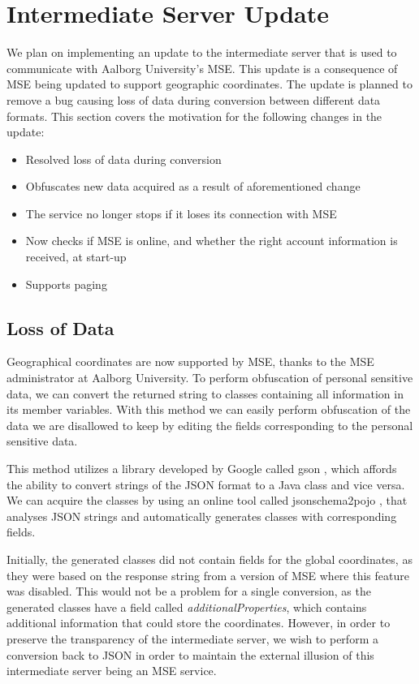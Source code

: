 \section{Intermediate Server Update}\label{sec:proxy_update1}
We plan on implementing an update to the intermediate server that is used to communicate with Aalborg University's MSE. This update is a consequence of MSE being updated to support geographic coordinates. The update is planned to remove a bug causing loss of data during conversion between different data formats. This section covers the motivation for the following changes in the update:

\begin{itemize}
\item Resolved loss of data during conversion
\item Obfuscates new data acquired as a result of aforementioned change
\item The service no longer stops if it loses its connection with MSE
\item Now checks if MSE is online, and whether the right account information is received, at start-up
\item Supports paging
\end{itemize}

\subsection{Loss of Data}
Geographical coordinates are now supported by MSE, thanks to the MSE administrator at Aalborg University. To perform obfuscation of personal sensitive data, we can convert the returned string to classes containing all information in its member variables. With this method we can easily perform obfuscation of the data we are disallowed to keep by editing the fields corresponding to the personal sensitive data.

This method utilizes a library developed by Google called gson \cite{gson}, which affords the ability to convert strings of the JSON format to a Java class and vice versa. We can acquire the classes by using an online tool called jsonschema2pojo \cite{jsonschematwopojo}, that analyses JSON strings and automatically generates classes with corresponding fields.

Initially, the generated classes did not contain fields for the global coordinates, as they were based on the response string from a version of MSE where this feature was disabled. This would not be a problem for a single conversion, as the generated classes have a field called \textit{additionalProperties}, which contains additional information that could store the coordinates. However, in order to preserve the transparency of the intermediate server, we wish to perform a conversion back to JSON in order to maintain the external illusion of this intermediate server being an MSE service.

